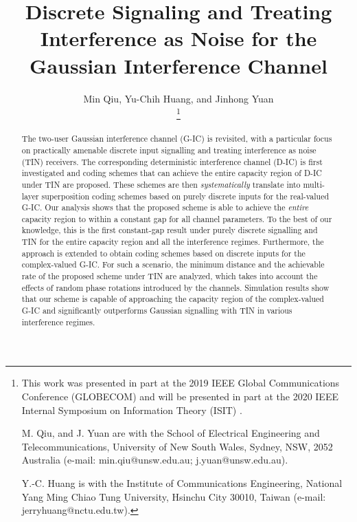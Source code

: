 \documentclass[12pt, draftclsnofoot, onecolumn]{IEEEtran}
\theoremstyle{definition}
\begin{document}
\title{Discrete Signaling and Treating Interference as Noise for the Gaussian Interference Channel}
\author{Min Qiu, Yu-Chih Huang, and Jinhong Yuan


\thanks{This work was presented in part at the 2019 IEEE Global Communications Conference (GLOBECOM) \cite{Qiu19Globecom} and will be presented in part at the 2020 IEEE Internal Symposium on Information Theory (ISIT) \cite{Qiu2020ISIT}.

M. Qiu, and J. Yuan are with the School of Electrical Engineering and Telecommunications, University of New South Wales, Sydney, NSW, 2052 Australia (e-mail: min.qiu@unsw.edu.au; j.yuan@unsw.edu.au).

Y.-C. Huang is with the Institute of Communications Engineering, National Yang Ming Chiao Tung University, Hsinchu City 30010, Taiwan (e-mail: jerryhuang@nctu.edu.tw).
}%
}

\maketitle



\begin{abstract}
The two-user Gaussian interference channel (G-IC) is revisited, with a particular focus on practically amenable discrete input signalling and treating interference as noise (TIN) receivers. The corresponding deterministic interference channel (D-IC) is first investigated and coding schemes that can achieve the entire capacity region of D-IC under TIN are proposed. These schemes are then \emph{systematically} translate into multi-layer superposition coding schemes based on purely discrete inputs for the real-valued G-IC. Our analysis shows that the proposed scheme is able to achieve the \emph{entire} capacity region to within a constant gap for all channel parameters. To the best of our knowledge, this is the first constant-gap result under purely discrete signalling and TIN for the entire capacity region and all the interference regimes. Furthermore, the approach is extended to obtain coding schemes based on discrete inputs for the complex-valued G-IC. For such a scenario, the minimum distance and the achievable rate of the proposed scheme under TIN are analyzed, which takes into account the effects of random phase rotations introduced by the channels. Simulation results show that our scheme is capable of approaching the capacity region of the complex-valued G-IC and significantly outperforms Gaussian signalling with TIN in various interference regimes.
\end{abstract}
\end{document}
